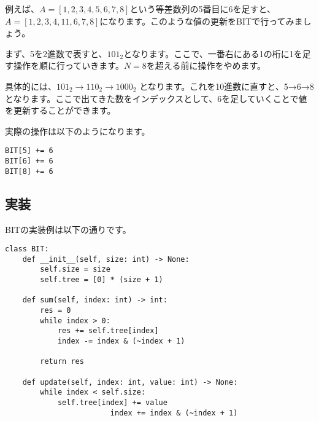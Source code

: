 \documentclass{jlreq}
\begin{document}
例えば、$A = [1, 2, 3, 4, 5, 6, 7, 8]$という等差数列の5番目に6を足すと、$A = [1, 2, 3, 4, 11, 6, 7, 8]$になります。このような値の更新をBITで行ってみましょう。

まず、5を2進数で表すと、$101_2$となります。ここで、一番右にある1の桁に1を足す操作を順に行っていきます。$N = 8$を超える前に操作をやめます。

具体的には、$101_2 \rightarrow 110_2 \rightarrow 1000_2$ となります。これを10進数に直すと、5→6→8となります。ここで出てきた数をインデックスとして、6を足していくことで値を更新することができます。

実際の操作は以下のようになります。

\begin{verbatim}
BIT[5] += 6
BIT[6] += 6
BIT[8] += 6
\end{verbatim}

\subsection{実装}
BITの実装例は以下の通りです。

\begin{lstlisting}[caption=BITの実装, label=bit, frame=TRBL, label={bit}]
	class BIT:
    def __init__(self, size: int) -> None:
        self.size = size
        self.tree = [0] * (size + 1)
    
    def sum(self, index: int) -> int:
        res = 0
        while index > 0:
            res += self.tree[index]
            index -= index & (~index + 1)
        
        return res
    
    def update(self, index: int, value: int) -> None:
        while index < self.size:
            self.tree[index] += value
						index += index & (~index + 1)
\end{lstlisting}
\end{document}
